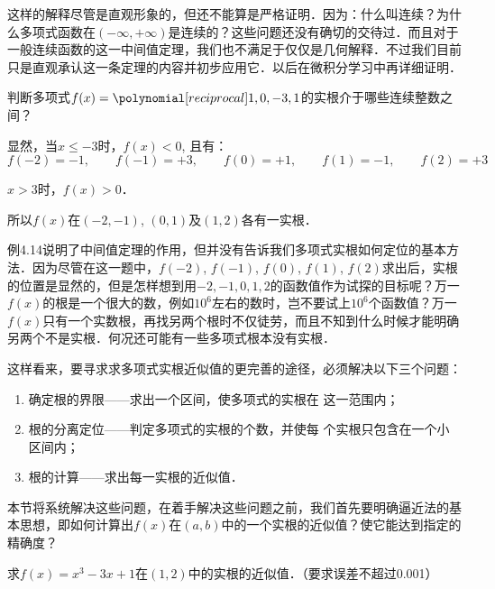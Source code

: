 这样的解释尽管是直观形象的，但还不能算是严格证明．因为：什么叫连续？为什么多项式函数在$(-\infty,+\infty)$是连续的？这些问题还没有确切的交待过．而且对于一般连续函数的这一中间值定理，我们也不满足于仅仅是几何解释．不过我们目前只是直观承认这一条定理的内容并初步应用它．以后在微积分学习中再详细证明．

\begin{example}
    判断多项式$f(x)=\poly{1,0,-3,1}$的实根介于哪些连续整数之间？
\end{example}

\begin{solution}
显然，当$x\le -3$时，$f(x)<0$, 且有：
\[f (-2) =-1,\qquad f (-1) =+3,\qquad f (0) =+1,\qquad f (1)=-1,\qquad f(2)=+3\]

$x>3$时，$f(x)>0$．

所以$f(x)$在$(-2,-1)$, $(0, 1)$及$(1, 2)$各有一实根．
\end{solution}
    
例4.14说明了中间值定理的作用，但并没有告诉我们多项式实根如何定位的基本方法．因为尽管在这一题中，$f(-2)$, $f(-1)$, $f(0)$, $f(1)$, $f(2)$求出后，实根的位置是显然的，但是怎样想到用$-2,-1, 0, 1, 2$的函数值作为试探的目标呢？万一$f(x)$的根是一个很大的数，例如$10^6$左右的数时，岂不要试上$10^6$个函数值？万一$f(x)$只有一个实数根，再找另两个根时不仅徒劳，而且不知到什么时候才能明确另两个不是实根．何况还可能有一些多项式根本没有实根．

这样看来，要寻求求多项式实根近似值的更完善的途径，必须解决以下三个问题：
\begin{enumerate}
\item 确定根的界限——求出一个区间，使多项式的实根在
这一范围内；    
\item 根的分离定位——判定多项式的实根的个数，并使每
个实根只包含在一个小区间内；    
\item 根的计算——求出每一实根的近似值．
\end{enumerate}

本节将系统解决这些问题，在着手解决这些问题之前，我们首先要明确逼近法的基本思想，即如何计算出$f(x)$在$(a,b)$中的一个实根的近似值？使它能达到指定的精确度？

\begin{example}
    求$f(x)=x^3-3x+1$在$(1, 2)$中的实根的近似值．（要求误差不超过0.001）
\end{example}


